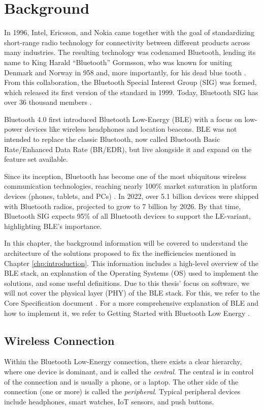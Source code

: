 \chapter{Background}
\label{chp:chapter_2}
In 1996, Intel, Ericsson, and Nokia came together with the goal of standardizing short-range radio technology for connectivity between different products across many industries. The resulting technology was codenamed Bluetooth, lending its name to King Harald ``Bluetooth'' Gormsson, who was known for uniting Denmark and Norway in 958 and, more importantly, for his dead blue tooth \cite{bluetooth_sig_name}. From this collaboration, the Bluetooth Special Interest Group (SIG) was formed, which released its first version of the standard in 1999. Today, Bluetooth SIG has over 36 thousand members \cite{bluetooth_sig_us}.

Bluetooth 4.0 first introduced Bluetooth Low-Energy (BLE) with a focus on low-power devices like wireless headphones and location beacons. BLE was not intended to replace the classic Bluetooth, now called Bluetooth Basic Rate/Enhanced Data Rate (BR/EDR), but live alongside it and expand on the feature set available.

Since its inception, Bluetooth has become one of the most ubiquitous wireless communication technologies, reaching nearly 100\% market saturation in platform devices (phones, tablets, and PCs) \cite{bluetooth_market_update_2022}. In 2022, over 5.1 billion devices were shipped with Bluetooth radios, projected to grow to 7 billion by 2026. By that time, Bluetooth SIG expects 95\% of all Bluetooth devices to support the LE-variant, highlighting BLE's importance.

In this chapter, the background information will be covered to understand the architecture of the solutions proposed to fix the inefficiencies mentioned in Chapter \ref{chp:introduction}. This information includes a high-level overview of the BLE stack, an explanation of the Operating Systems (OS) used to implement the solutions, and some useful definitions. Due to this thesis' focus on software, we will not cover the physical layer (PHY) of the BLE stack. For this, we refer to the Core Specification document \cite{bluetooth_spec}. For a more comprehensive explanation of BLE and how to implement it, we refer to Getting Started with Bluetooth Low Energy \cite{townsend_cufi}.

\section{Wireless Connection}
\label{sec:ch2_wireless_connection}
Within the Bluetooth Low-Energy connection, there exists a clear hierarchy, where one device is dominant, and is called the \textit{central}. The central is in control of the connection and is usually a phone, or a laptop. The other side of the connection (one or more) is called the \textit{peripheral}. Typical peripheral devices include headphones, smart watches, IoT sensors, and push buttons. 

